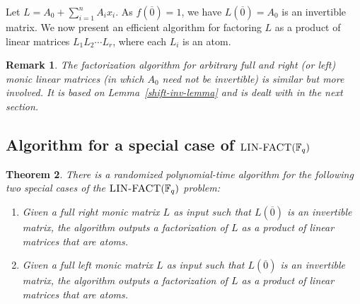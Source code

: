 \documentclass[10pt,a4paper]{article}
\newtheorem{theorem}{Theorem}[section]
\newtheorem{remark}[theorem]{Remark}
\newcommand{\F}{\mathbb{F}}
\newcommand{\prob}[1]{\textsc{#1}}
\begin{document}
Let $L=A_0+\sum_{i=1}^n A_i x_i$. As $f(\overline{0})=1$, we have
$L(\overline{0})=A_0$ is an invertible matrix. We now present an
efficient algorithm for factoring $L$ as a product of linear matrices
$L_1L_2\cdots L_r$, where each $L_i$ is an atom.

\begin{remark}
The factorization algorithm for arbitrary full and right (or left)
monic linear matrices (in which $A_0$ need not be invertible) is
similar but more involved. It is based on Lemma~\ref{shift-inv-lemma}
and is dealt with in the next section.
\end{remark}

\subsection{Algorithm for a special case of $\prob{LIN{-}FACT}(\F_q)$}

%
%
%
%
%

\begin{theorem}\label{lfact1}
  There is a randomized polynomial-time algorithm for the following
  two special cases of the $\prob{LIN{-}FACT}(\F_q)$ problem:
  \begin{enumerate}
 \item Given a full right monic matrix $L$ as input such that
   $L(\overline{0})$ is an invertible matrix, the algorithm outputs a
   factorization of $L$ as a product of linear matrices that are
   atoms.
  \item Given a full left monic matrix $L$ as input such that
   $L(\overline{0})$ is an invertible matrix, the algorithm outputs a
   factorization of $L$ as a product of linear matrices that are
   atoms.  
\end{enumerate}
\end{theorem}  
\end{document}
